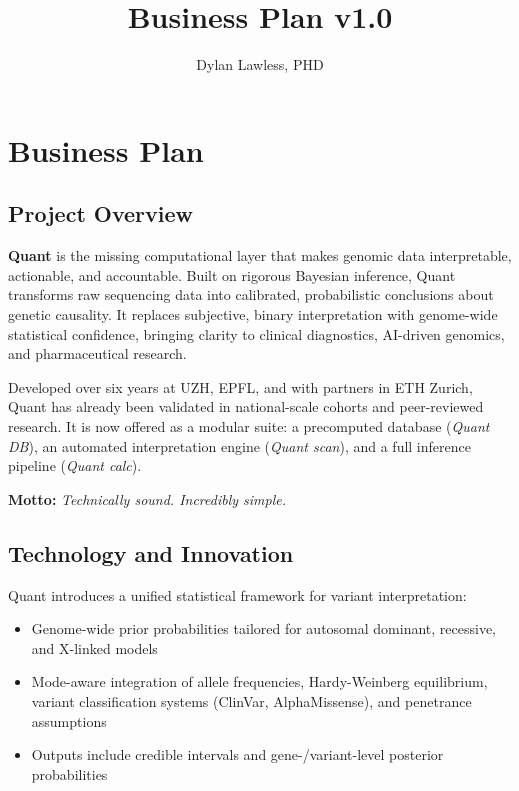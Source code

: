 \documentclass[preprint,12pt,fleqn]{article}
\newcommand{\version}{v1.0}
\begin{document}
\title{\Large \bf \SO\\
Business Plan {\version}}

\author[1]{\rm Dylan Lawless, PHD}
\maketitle
\color{swissblack}
\tableofcontents
{} 
\clearpage


\section{Business Plan}

\subsection{Project Overview}

\textbf{Quant} is the missing computational layer that makes genomic data interpretable, actionable, and accountable. Built on rigorous Bayesian inference, Quant transforms raw sequencing data into calibrated, probabilistic conclusions about genetic causality. It replaces subjective, binary interpretation with genome-wide statistical confidence, bringing clarity to clinical diagnostics, AI-driven genomics, and pharmaceutical research.

Developed over six years at UZH, EPFL, and with partners in ETH Zurich, Quant has already been validated in national-scale cohorts and peer-reviewed research. It is now offered as a modular suite: a precomputed database (\textit{Quant DB}), an automated interpretation engine (\textit{Quant scan}), and a full inference pipeline (\textit{Quant calc}).

\vspace{0.5em}
\noindent\textbf{Motto:} \textit{Technically sound. Incredibly simple.}

\subsection{Technology and Innovation}

Quant introduces a unified statistical framework for variant interpretation:
\begin{itemize}
  \item Genome-wide prior probabilities tailored for autosomal dominant, recessive, and X-linked models
  \item Mode-aware integration of allele frequencies, Hardy-Weinberg equilibrium, variant classification systems (ClinVar, AlphaMissense), and penetrance assumptions
  \item Outputs include credible intervals and gene-/variant-level posterior probabilities
\end{itemize}
\end{document}
